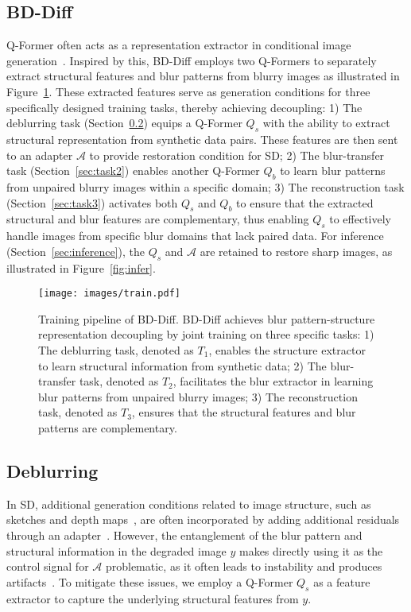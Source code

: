 \subsection{BD-Diff} 

Q-Former often acts as a representation extractor in conditional image generation~\cite{li2023blip, li2024blip}. Inspired by this, BD-Diff employs two Q-Formers to separately extract structural features and blur patterns from blurry images as illustrated in Figure~\ref{fig:train}. These extracted features serve as generation conditions for three specifically designed training tasks, thereby achieving decoupling: 1) The deblurring task (Section~\ref{sec:task1}) equips a Q-Former $Q_s$ with the ability to extract structural representation from synthetic data pairs. These features are then sent to an adapter $\mathcal{A}$ to provide restoration condition for SD; 2) The blur-transfer task (Section~\ref{sec:task2}) enables another Q-Former $Q_b$ to learn blur patterns from unpaired blurry images within a specific domain; 3) The reconstruction task (Section~\ref{sec:task3}) activates both $Q_s$ and $Q_b$ to ensure that the extracted structural and blur features are complementary, thus enabling $Q_s$ to effectively handle images from specific blur domains that lack paired data. For inference (Section~\ref{sec:inference}), the $Q_s$ and $\mathcal{A}$ are retained to restore sharp images, as illustrated in Figure~\ref{fig:infer}.

\begin{figure}[t]
	\centering
	\texttt{[image: images/train.pdf]}
	\caption{Training pipeline of BD-Diff. BD-Diff achieves blur pattern-structure representation decoupling by joint training on three specific tasks: 1) The deblurring task, denoted as $T_1$, enables the structure extractor to learn structural information from synthetic data; 2) The blur-transfer task, denoted as $T_2$, facilitates the blur extractor in learning blur patterns from unpaired blurry images; 3) The reconstruction task, denoted as $T_3$, ensures that the structural features and blur patterns are complementary.}
	\label{fig:train}
\end{figure}

\subsection{Deblurring}
\label{sec:task1}

In SD, additional generation conditions related to image structure, such as sketches and depth maps~\cite{cheng2024theatergen,peng2024controlnext}, are often incorporated by adding additional residuals through an adapter~\cite{zhang2023adding,mou2024adapter}. However, the entanglement of the blur pattern and structural information in the degraded image $y$ makes directly using it as the control signal for $\mathcal{A}$ problematic, as it often leads to instability and produces artifacts~\cite{lin2025diffbir}. To mitigate these issues, we employ a Q-Former $Q_s$ as a feature extractor to capture the underlying structural features from $y$. 

